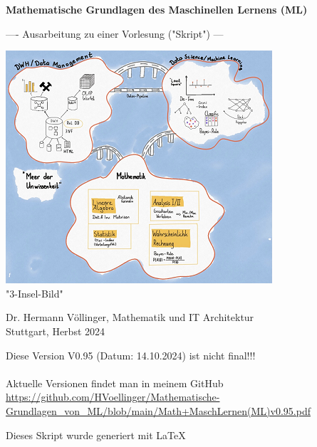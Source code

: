 \documentclass[12pt]{article}
\begin{document}

\begin{titlepage}
   \begin{center}
   \LARGE  
   \vspace{1.0cm}
       
   \textbf{Mathematische Grundlagen des Maschinellen Lernens (ML)}

   \vspace{1.0cm}
  
   \large       
   ---- Ausarbeitung zu einer Vorlesung ("Skript") ---
       
   
   \vspace{1.0cm}
   
   \includegraphics{DWH-Zeichnung}\\
   \small "3-Insel-Bild"  
       
   \vfill
   \large   
   
   Dr. Hermann Völlinger, Mathematik und IT Architektur
           \\ Stuttgart, Herbst 2024     

   \vspace{0.6cm}
        
   \end{center}
   
\begin{center}
Diese Version V0.95 (Datum: 14.10.2024) ist nicht final!!! \\
{\color{red}{(Beachte: ************ Kommentare *********)}} \\[0.3cm]
Aktuelle Versionen findet man in meinem GitHub\\[0.1cm]
\url{https://github.com/HVoellinger/Mathematische-Grundlagen_von_ML/blob/main/Math+MaschLernen(ML)v0.95.pdf} \\
\vspace{0.4cm}
\begin{large}
Dieses Skript wurde generiert mit \LaTeX\  
\end{large}
\end{center}


\end{titlepage}
\end{document}
